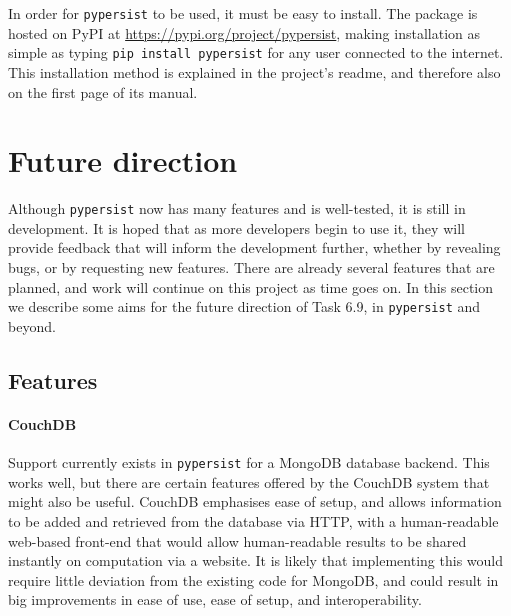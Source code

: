 \documentclass{deliverablereport}
\newcommand{\pypersist}{\texttt{pypersist}}
\begin{document}
In order for \pypersist{} to be used, it must be easy to install.  The package
is hosted on PyPI at \url{https://pypi.org/project/pypersist}, making
installation as simple as typing \texttt{pip install pypersist} for any user
connected to the internet.  This installation method is explained in the
project's readme, and therefore also on the first page of its manual.


\section{Future direction}
\label{sec:future}

Although \pypersist{} now has many features and is well-tested, it is still in
development.  It is hoped that as more developers begin to use it, they will
provide feedback that will inform the development further, whether by revealing
bugs, or by requesting new features.  There are already several features that
are planned, and work will continue on this project as time goes on.  In this
section we describe some aims for the future direction of Task 6.9, in
\pypersist{} and beyond.

\subsection{Features}

\paragraph{CouchDB}
Support currently exists in \pypersist{} for a MongoDB database backend.  This
works well, but there are certain features offered by the CouchDB system that
might also be useful.  CouchDB emphasises ease of setup, and allows information
to be added and retrieved from the database via HTTP, with a human-readable
web-based front-end that would allow human-readable results to be shared
instantly on computation via a website.  It is likely that implementing this
would require little deviation from the existing code for MongoDB, and could
result in big improvements in ease of use, ease of setup, and interoperability.
\end{document}
